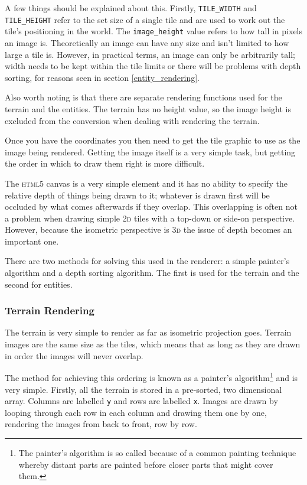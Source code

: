 A few things should be explained about this. Firstly, \texttt{TILE\_WIDTH} and \texttt{TILE\_HEIGHT} refer to the set size of a single tile and are used to work out the tile's positioning in the world. The \texttt{image\_height} value refers to how tall in pixels an image is. Theoretically an image can have any size and isn't limited to how large a tile is. However, in practical terms, an image can only be arbitrarily tall; width needs to be kept within the tile limits or there will be problems with depth sorting, for reasons seen in section \ref{entity_rendering}.

Also worth noting is that there are separate rendering functions used for the terrain and the entities. The terrain has no height value, so the image height is excluded from the conversion when dealing with rendering the terrain.

Once you have the coordinates you then need to get the tile graphic to use as the image being rendered. Getting the image itself is a very simple task, but getting the order in which to draw them right is more difficult.

The \textsc{html5} canvas is a very simple element and it has no ability to specify the relative depth of things being drawn to it; whatever is drawn first will be occluded by what comes afterwards if they overlap. This overlapping is often not a problem when drawing simple \textsc{2d} tiles with a top-down or side-on perspective. However, because the isometric perspective is \textsc{3d} the issue of depth becomes an important one.


There are two methods for solving this used in the renderer: a simple painter's algorithm and a depth sorting algorithm. The first is used for the terrain and the second for entities.

\subsubsection{Terrain Rendering}
The terrain is very simple to render as far as isometric projection goes. Terrain images are the same size as the tiles, which means that as long as they are drawn in order the images will never overlap.

The method for achieving this ordering is known as a painter's algorithm\footnote{The painter's algorithm is so called because of a common painting technique whereby distant parts are painted before closer parts that might cover them.} and is very simple. Firstly, all the terrain is stored in a pre-sorted, two dimensional array. Columns are labelled \texttt{y} and rows are labelled \texttt{x}. Images are drawn by looping through each row in each column and drawing them one by one, rendering the images from back to front, row by row.

